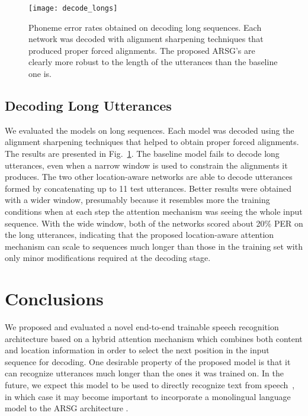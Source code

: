 \documentclass{article}
\begin{document}
\begin{figure}[t]
  \centering
  \texttt{[image: decode\_longs]}
\caption[Phoneme error rates obtained on decoding long sequences.]{ 
      Phoneme error rates obtained on decoding long sequences. Each network was
      decoded with alignment sharpening techniques that produced proper forced
      alignments. The proposed ARSG's are clearly more robust to the length of
      the utterances than the baseline one is.
  }
  \label{fig:decoding_longs}

  \vspace{-4mm}
\end{figure}

\subsection{Decoding Long Utterances}

We evaluated the models on long sequences. Each model was decoded using the
alignment sharpening techniques that helped to obtain proper forced alignments.
The results are presented in Fig.~\ref{fig:decoding_longs}. The baseline model
fails to decode long utterances, even when a narrow window is used to constrain
the alignments it produces. The two other location-aware networks 
are able to decode utterances formed by concatenating up to 11 test utterances.
Better results were obtained with a wider window, presumably because it
resembles more the training conditions when at each step the attention mechanism
was seeing the whole input sequence.  With the wide window, both of the networks
scored about 20\% PER on the long utterances, indicating that the proposed
location-aware attention mechanism can scale to sequences much longer than those
in the training set with only minor modifications required at the decoding
stage.

\section{Conclusions}

We proposed and evaluated a novel end-to-end trainable speech recognition
architecture based on a hybrid attention mechanism which combines both content
and location information in order to select the next position in the input
sequence for decoding. One desirable property of the proposed model is that it
can recognize utterances much longer than the ones it was trained on. In the
future, we expect this model to be used to directly recognize text from
speech~\cite{hannun2014_deepspeech,graves_2014_towards}, in which case  it may
become important to incorporate a monolingual language model to the ARSG
architecture \cite{gulcehre_2015}.
\end{document}
